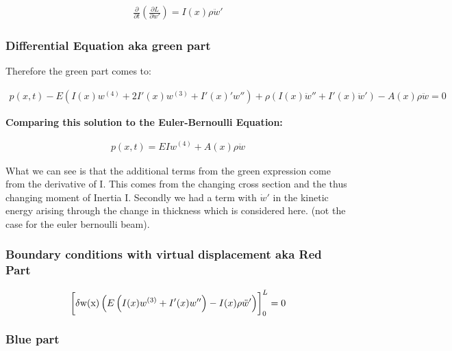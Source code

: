 \begin{equation}
    \begin{split}
        \frac{\partial}{\partial t}(\frac{\partial L}{\partial \dot w'})= I(x)\rho \ddot w'
    \end{split}
\end{equation}

\subsubsection{Differential Equation aka green part}

Therefore the green part comes to:

\begin{equation}
    \begin{split}
        p(x,t)-E\left(I(x)w^{(4)}+2I'(x)w^{(3)}+I'(x)'w''\right)+\rho \left(I(x)\ddot w''+I'(x)\ddot w'\right)-A(x)\rho \ddot w = 0
    \end{split}
\end{equation}

\textbf{Comparing this solution to the Euler-Bernoulli Equation:}

\begin{equation}
    \begin{split}
        p(x,t) = EIw^{(4)} + A(x)\rho \ddot w
    \end{split}
\end{equation}

What we can see is that the additional terms from the green expression come from the derivative of I. This comes from the changing cross section and the thus changing moment of Inertia I. Secondly we had a term with $\dot w'$ in the kinetic energy arising through the change in thickness which is considered here. (not the case for the euler bernoulli beam).

\subsubsection{Boundary conditions with virtual displacement aka Red Part}

\begin{equation}
    \begin{split}
        \left[\vphantom{\int}\mathrm{\delta w(x)}\left(E\left(I(x)w^{(3)}+I'(x)w''\right)-I(x)\rho \ddot w'\right)\right]_0^L  = 0
    \end{split}
\end{equation}

\subsubsection{Blue part}

